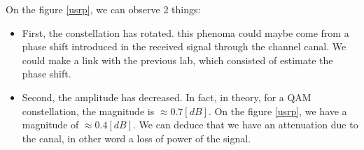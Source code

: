 \documentclass[frenchb, oneside, headings=normal]{scrartcl}
\begin{document}
On the figure \ref{usrp}, we can observe 2 things:

\begin{itemize}

\item First, the constellation has rotated. this phenoma could maybe come from a phase shift introduced in the received signal through the channel canal. We could make a link with the previous lab, which consisted of estimate the phase shift.

\item Second, the amplitude has decreased. In fact, in theory, for a QAM constellation, the magnitude is $\approx 0.7 [dB]$. On the figure \ref{usrp}, we have a magnitude of $\approx 0.4 [dB]$. We can deduce that we have an attenuation due to the canal, in other word a loss of power of the signal.

\end{itemize}
\end{document}
